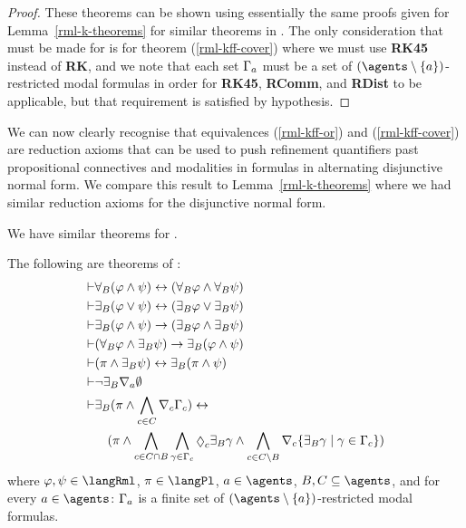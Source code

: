 \begin{proof}
These theorems can be shown using essentially the same proofs given for Lemma~\ref{rml-k-theorems} for similar theorems in \axiomRmlK{}.
The only consideration that must be made for \axiomRmlKFF{} is for theorem (\ref{rml-kff-cover}) where we must use {\bf RK45} instead of {\bf RK}, and we note that each set $\Gamma_a$ must be a set of $(\agents \setminus \{\agentA\})$-restricted modal formulas in order for {\bf RK45}, {\bf RComm}, and {\bf RDist} to be applicable, but that requirement is satisfied by hypothesis.
\end{proof}

We can now clearly recognise that equivalences (\ref{rml-kff-or}) and (\ref{rml-kff-cover}) are reduction axioms that can be used to push refinement quantifiers past propositional connectives and modalities in formulas in alternating disjunctive normal form.
We compare this result to Lemma~\ref{rml-k-theorems} where we had similar reduction axioms for the disjunctive normal form.

We have similar theorems for \axiomRmlKD{}.

\begin{lemma}\label{rml-kd-theorems}
The following are theorems of \axiomRmlKD{}:
\begin{align}
    \proves & \allrefsBs (\phi \land \psi) \iff (\allrefsBs \phi \land \allrefsBs \psi) \label{rml-kd-and}\\
    \proves & \somerefsBs (\phi \lor \psi) \iff (\somerefsBs \phi \lor \somerefsBs \psi) \label{rml-kd-or}\\
    \proves & \somerefsBs (\phi \land \psi) \implies (\somerefsBs \phi \land \somerefsBs \psi) \label{rml-kd-d-and}\\
    \proves & (\allrefsBs \phi \land \somerefsBs \psi) \implies \somerefsBs (\phi \land \psi) \label{rml-kd-db-and}\\
    \proves & (\pi \land \somerefsBs \psi) \iff \somerefsBs (\pi \land \psi) \label{rml-kd-pd-and}\\
    \proves & \lnot \somerefsBs \coversA \emptyset \label{rml-kd-cover-empty}\\
    \proves & \displaystyle \somerefsBs (\pi \land \bigwedge_{\agentC \in \agentsC} \coverC \Gamma_\agentC) \iff \nonumber\\
            & \displaystyle \quad
            (
            \pi \land
            \bigwedge_{\agentC \in \agentsC \cap \agentsB} \bigwedge_{\gamma \in \Gamma_\agentC} \possibleC \somerefsBs \gamma \land
            \bigwedge_{\agentC \in \agentsC \setminus \agentsB} \coversC \{\somerefsBs \gamma \mid \gamma \in \Gamma_\agentC\} 
            ) \label{rml-kd-cover}
\end{align}
where $\phi, \psi \in \langRml$, $\pi \in \langPl$, $\agentA \in \agents$, $\agentsB, \agentsC \subseteq \agents$, and for every $\agentA \in \agents$: $\Gamma_a$ is a finite set of $(\agents \setminus \{\agentA\})$-restricted modal formulas.
\end{lemma}


